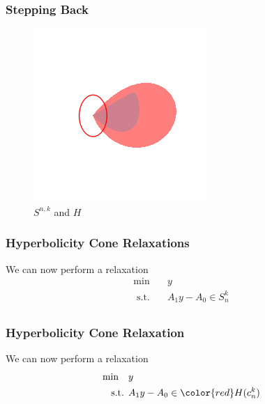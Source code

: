 \documentclass{beamer}
\newcommand{\st}{{\text{ s.t. }}}
\begin{document}
\begin{frame}
    \frametitle{Stepping Back}
    \begin{figure}[h]
        \centering
        \includegraphics[width=0.6\linewidth]{comparison_circle.png}
        \caption{$S^{n,k}$ and $H$}%
        \label{fig:just_snk}
    \end{figure}
\end{frame}
\begin{frame}
    \frametitle{Hyperbolicity Cone Relaxations}
    We can now perform a relaxation
    \begin{equation*}
        \begin{aligned}
            \min\quad & y\\
            \st & A_1y - A_0 \in S^k_n\\
        \end{aligned}
    \end{equation*}
\end{frame}
\begin{frame}
    \frametitle{Hyperbolicity Cone Relaxation}
    We can now perform a relaxation
        \begin{equation*}
            \begin{aligned}
                \min\quad & y\\
                \st & A_1y - A_0 \in {\color{red} H(c_n^k)}\\
            \end{aligned}
        \end{equation*}
    \pause
\end{frame}
\end{document}
